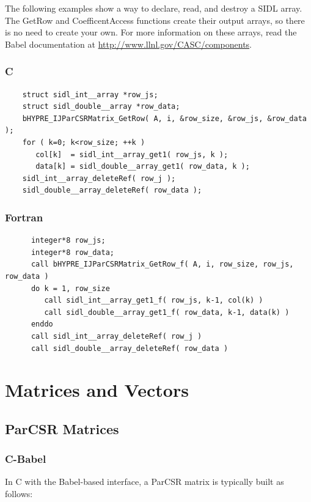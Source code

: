 The following examples show a way to declare, read, and destroy a SIDL
array.  The GetRow and CoefficentAccess functions create their output
arrays, so there is no need to create your own.  For more information
on these arrays, read the Babel documentation at
\url{http://www.llnl.gov/CASC/components}.


\subsubsection{C}
\begin{verbatim}
    struct sidl_int__array *row_js;
    struct sidl_double__array *row_data;
    bHYPRE_IJParCSRMatrix_GetRow( A, i, &row_size, &row_js, &row_data );
    for ( k=0; k<row_size; ++k )
       col[k]  = sidl_int__array_get1( row_js, k );
       data[k] = sidl_double__array_get1( row_data, k );
    sidl_int__array_deleteRef( row_j );
    sidl_double__array_deleteRef( row_data );
\end{verbatim}
\subsubsection{Fortran}
\begin{verbatim}
      integer*8 row_js;
      integer*8 row_data;
      call bHYPRE_IJParCSRMatrix_GetRow_f( A, i, row_size, row_js, row_data )
      do k = 1, row_size
         call sidl_int__array_get1_f( row_js, k-1, col(k) )
         call sidl_double__array_get1_f( row_data, k-1, data(k) )
      enddo
      call sidl_int__array_deleteRef( row_j )
      call sidl_double__array_deleteRef( row_data )
\end{verbatim}


\section{Matrices and Vectors}

\subsection{ParCSR Matrices}

\subsubsection{C-Babel}
In C with the Babel-based interface, a ParCSR matrix is typically built as follows:

